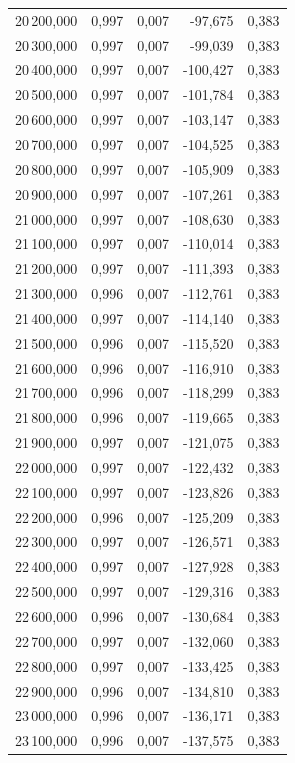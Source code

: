 \begin{longtable}{rrrrr}
20\,200,000 & 0,997 & 0,007 & -97,675 & 0,383\\
20\,300,000 & 0,997 & 0,007 & -99,039 & 0,383\\
20\,400,000 & 0,997 & 0,007 & -100,427 & 0,383\\
20\,500,000 & 0,997 & 0,007 & -101,784 & 0,383\\
20\,600,000 & 0,997 & 0,007 & -103,147 & 0,383\\
20\,700,000 & 0,997 & 0,007 & -104,525 & 0,383\\
20\,800,000 & 0,997 & 0,007 & -105,909 & 0,383\\
20\,900,000 & 0,997 & 0,007 & -107,261 & 0,383\\
21\,000,000 & 0,997 & 0,007 & -108,630 & 0,383\\
21\,100,000 & 0,997 & 0,007 & -110,014 & 0,383\\
21\,200,000 & 0,997 & 0,007 & -111,393 & 0,383\\
21\,300,000 & 0,996 & 0,007 & -112,761 & 0,383\\
21\,400,000 & 0,997 & 0,007 & -114,140 & 0,383\\
21\,500,000 & 0,996 & 0,007 & -115,520 & 0,383\\
21\,600,000 & 0,996 & 0,007 & -116,910 & 0,383\\
21\,700,000 & 0,996 & 0,007 & -118,299 & 0,383\\
21\,800,000 & 0,996 & 0,007 & -119,665 & 0,383\\
21\,900,000 & 0,997 & 0,007 & -121,075 & 0,383\\
22\,000,000 & 0,997 & 0,007 & -122,432 & 0,383\\
22\,100,000 & 0,997 & 0,007 & -123,826 & 0,383\\
22\,200,000 & 0,996 & 0,007 & -125,209 & 0,383\\
22\,300,000 & 0,997 & 0,007 & -126,571 & 0,383\\
22\,400,000 & 0,997 & 0,007 & -127,928 & 0,383\\
22\,500,000 & 0,997 & 0,007 & -129,316 & 0,383\\
22\,600,000 & 0,996 & 0,007 & -130,684 & 0,383\\
22\,700,000 & 0,997 & 0,007 & -132,060 & 0,383\\
22\,800,000 & 0,997 & 0,007 & -133,425 & 0,383\\
22\,900,000 & 0,996 & 0,007 & -134,810 & 0,383\\
23\,000,000 & 0,996 & 0,007 & -136,171 & 0,383\\
23\,100,000 & 0,996 & 0,007 & -137,575 & 0,383\\

\end{longtable}
